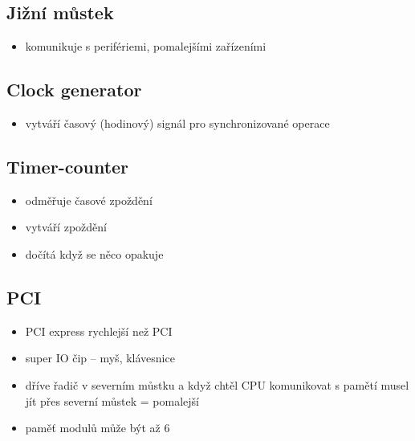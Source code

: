 \documentclass[a4paper,12pt]{article}
\providecommand{\tightlist}{%
\setlength{\itemsep}{0pt}\setlength{\parskip}{0pt}}
\begin{document}
\subsection{Jižní můstek}

\begin{itemize}
  \item komunikuje s perifériemi, pomalejšími zařízeními
\end{itemize}

\subsection{Clock generator}

\begin{itemize}
  \item vytváří časový (hodinový) signál pro synchronizované operace
\end{itemize}

\subsection{Timer-counter}

\begin{itemize}
  \tightlist
  \item odměřuje časové zpoždění
  \item vytváří zpoždění
  \item dočítá když se něco opakuje
\end{itemize}
  
\subsection{PCI}
\begin{itemize}
  \tightlist
  \item PCI express rychlejší než PCI
  \item super IO čip -- myš, klávesnice
\end{itemize}


\begin{itemize}
  \tightlist
  \item dříve řadič v severním můstku a když chtěl CPU komunikovat s pamětí musel jít přes severní můstek = pomalejší
  \item paměť modulů může být až 6
\end{itemize}
\end{document}
